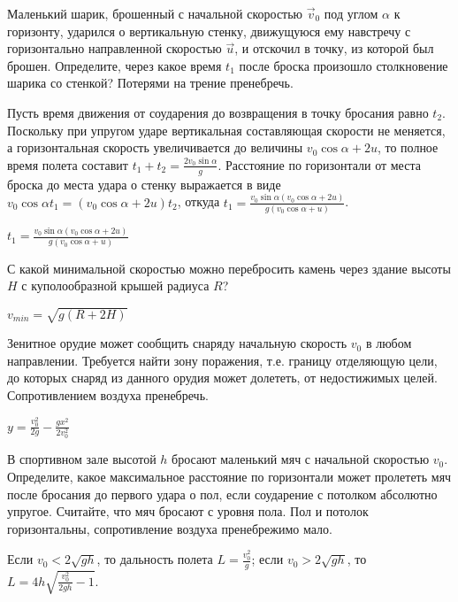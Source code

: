 \begin{ex}
Маленький шарик, брошенный с начальной скоростью $\vec{v}_0$ под углом $\alpha$ к горизонту, 
ударился о вертикальную стенку, движущуюся ему навстречу с горизонтально направленной скоростью $\vec u$, и отскочил в точку, из которой был брошен. 
Определите, через какое время $t_1$ после броска произошло столкновение шарика со стенкой? Потерями на трение пренебречь.
\begin{sol}
Пусть время движения от соударения до возвращения в точку бросания равно $t_2$. Поскольку при упругом ударе вертикальная составляющая скорости не меняется, а горизонтальная скорость увеличивается до величины $v_0 \cos \alpha + 2u$, то полное время полета составит $t_1 + t_2 = \frac{2v_0 \sin \alpha}{g}$. Расстояние по горизонтали от места броска до места удара о стенку выражается в виде $v_0 \cos \alpha t_1 = (v_0 \cos \alpha +2u)t_2$, откуда $t_1 = \frac{v_0 \sin \alpha (v_0 \cos \alpha + 2u)}{g(v_0 \cos \alpha + u)}$.
\end{sol}
\begin{ans}
$t_1 = \frac{v_0 \sin \alpha (v_0 \cos \alpha + 2u)}{g(v_0 \cos \alpha + u)}$
\end{ans}
\end{ex}

\begin{ex}
С какой минимальной скоростью можно перебросить камень через здание высоты $H$ с куполообразной крышей радиуса $R$?
\begin{ans}
$v_{min} = \sqrt{g(R+2H)}$
\end{ans}
\end{ex}

\begin{ex}
Зенитное орудие может сообщить снаряду начальную скорость $v_0$ в любом направлении. Требуется найти зону поражения, т.е. границу отделяющую цели, до которых снаряд из данного орудия может долететь, от недостижимых целей. Сопротивлением воздуха пренебречь. 
\begin{ans}
$y = \frac{v_0^2}{2g} - \frac{gx^2}{2v_0^2}$
\end{ans}
\end{ex}

\begin{ex}
В спортивном зале высотой $h$ бросают маленький мяч с начальной скоростью $v_0$. Определите, какое максимальное расстояние по горизонтали может пролететь мяч после бросания до первого удара о пол, если соударение с потолком абсолютно упругое. Считайте, что мяч бросают с уровня пола. Пол и потолок горизонтальны, сопротивление воздуха пренебрежимо мало.
\begin{ans}
Если $v_0 < 2 \sqrt{gh}$, то дальность полета $L = \frac{v_0^2}{g}$; если $v_0 > 2 \sqrt{gh}$, то $L = 4h \sqrt{\frac{v_0^2}{2gh}-1}$.
\end{ans}
\end{ex}

